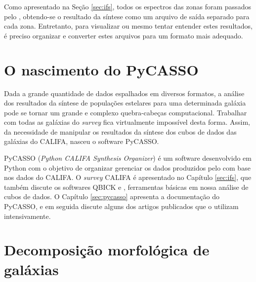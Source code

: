 Como apresentado na Seção \ref{sec:ifs}, todos os espectros das zonas foram
passados pelo \starlight, obtendo-se o resultado da síntese como um arquivo de
saída separado para cada zona. Entretanto, para visualizar ou mesmo tentar
entender estes resultados, é preciso organizar e converter estes arquivos para
um formato mais adequado.



\section{O nascimento do PyCASSO}

Dada a grande quantidade de dados espalhados em diversos formatos, a análise dos
resultados da síntese de populações estelares para uma determinada galáxia pode
se tornar um grande e complexo quebra-cabeças computacional. Trabalhar com todas
as galáxias do {\em survey} fica virtualmente impossível desta forma. Assim, da
necessidade de manipular os resultados da síntese dos cubos de dados das
galáxias do CALIFA, nasceu o software PyCASSO.

PyCASSO ({\em Python CALIFA \starlight Synthesis Organizer}) é um software
desenvolvido em Python com o objetivo de organizar gerenciar os dados produzidos
pelo \starlight com base nos dados do CALIFA. O {\em survey} CALIFA é
apresentado no Capítulo \ref{sec:ifs}, que também discute os softwares QBICK e
\starlight, ferramentas básicas em nossa análise de cubos de dados. O Capítulo
\ref{sec:pycasso} apresenta a documentação do PyCASSO, e em seguida discute
alguns dos artigos publicados que o utilizam intensivamente.



\section{Decomposição morfológica de galáxias}

